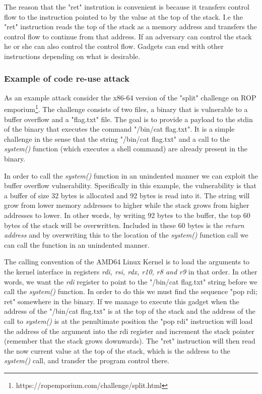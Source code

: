 The reason that the "ret" instrution is convenient is because it transfers control flow
to the instruction pointed to by the value at the top of the stack. I.e the "ret" instruction
reads the top of the stack as a memory address and transfers the control flow to continue
from that address. If an adversary can control the stack he or she can also control the
control flow. Gadgets can end with other instructions depending on what is desirable.

\subsubsection{Example of code re-use attack}

As an example attack consider the x86-64 version of the "split" challenge on ROP emporium\footnote{https://ropemporium.com/challenge/split.html}.
The challenge consists of two files, a binary that is vulnerable to a buffer overflow and
a "flag.txt" file. The goal is to provide a payload to the stdin of the binary that executes
the command "/bin/cat flag.txt". It is a simple challenge in the sense that the string
"/bin/cat flag.txt" and a call to the \textit{system()} function (which executes a shell
command) are already present in the binary.

In order to call the \textit{system()} function in an unindented manner we can exploit
the buffer overflow vulnerability. Specifically in this example, the vulnerability is that
a buffer of size 32 bytes is allocated and 92 bytes is read into it. The string will grow
from lower memory addresses to higher while the stack grows from higher addresses to
lower. In other words, by writing 92 bytes to the buffer, the top 60 bytes of the stack
will be overwritten. Included in these 60 bytes is the \textit{return address} and by
overwriting this to the location of the \textit{system()} function call we can call the
function in an unindented manner.

The calling convention of the AMD64 Linux Kernel is to load the arguments to the kernel
interface in registers \textit{rdi, rsi, rdx, r10, r8 and r9} in that order\cite{system-v-abi}.
In other words, we want the \textit{rdi} register to point to the "/bin/cat flag.txt" string
before we call the \textit{system()} function. In order to do this we must find the sequence
"pop rdi; ret" somewhere in the binary. If we manage to execute this gadget when the
address of the "/bin/cat flag.txt" is at the top of the stack and the address of the call to
\textit{system()} is at the penultimate position the "pop rdi" instruction will load the
address of the argument into the rdi register and increment the stack pointer (remember
that the stack grows downwards). The "ret" instruction will then read the now current
value at the top of the stack, which is the address to the \textit{system()} call, and
transfer the program control there.

